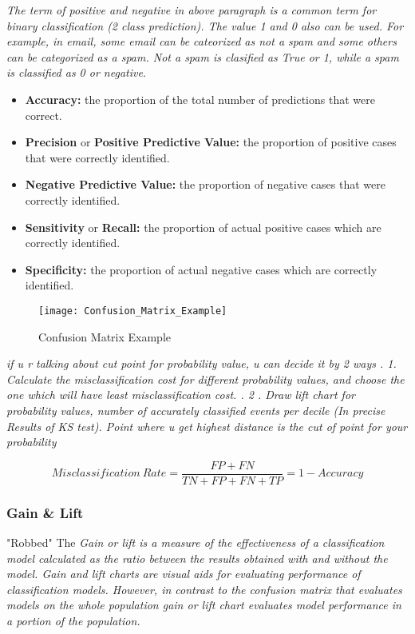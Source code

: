 \textit{The term of positive and negative in above paragraph is a common term for binary classification (2 class prediction). The value 1 and 0 also can be used. For example, in email, some email can be cateorized as not a spam and some others can be categorized as a spam. Not a spam is clasified as True or 1, while a spam is classified as 0 or negative.}

\begin{itemize}
	\item \textbf{Accuracy:} the proportion  of the total number of predictions that were correct.
	\item \textbf{Precision} or \textbf{Positive Predictive Value:} the proportion of positive cases that were correctly identified.
	\item \textbf{Negative Predictive Value:} the proportion of negative cases that were correctly identified.
	\item \textbf{Sensitivity} or \textbf{Recall:} the proportion of actual positive cases which are correctly identified.
	\item \textbf{Specificity:} the proportion of actual negative cases which are correctly identified.
\end{itemize}

\begin{figure}[H]
	\texttt{[image: Confusion\_Matrix\_Example]}
	\caption[Confusion Matrix Example]
	{Confusion Matrix Example}
	\label{fig:ConfusionMatrixExample}
\end{figure}

\textit{if u r talking about cut point for probability value, u can decide it by 2 ways .
	1. Calculate the misclassification cost for different probability values, and choose the one which will have least misclassification cost. .
	2 . Draw lift chart for probability values, number of accurately classified events per decile (In precise Results of KS test). Point where u get highest distance is the cut of point for your probability	
}

\begin{equation}
	Misclassification\ Rate = \frac{FP + FN}{TN + FP + FN + TP} = 1 - Accuracy
\end{equation}




\subsubsection{Gain \& Lift}
"Robbed" The
\textit{Gain or lift is a measure of the effectiveness of a classification model calculated as the ratio between the results obtained with and without the model. Gain and lift charts are visual aids for evaluating performance of classification models. However, in contrast to the confusion matrix that evaluates models on the whole population gain or lift chart evaluates model performance in a portion of the population. }


